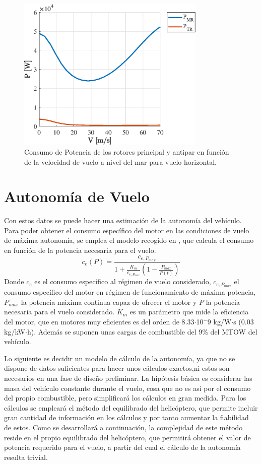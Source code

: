 \begin{figure}
	\centering
	\includegraphics[width=90mm]{graficos/PVH}
	\caption{Consumo de Potencia de los rotores principal y antipar en función de la velocidad de vuelo a nivel del mar para vuelo horizontal.}
	\label{PVH}
\end{figure}

\section{Autonomía de Vuelo}

Con estos datos se puede hacer una estimación de la autonomía del vehículo. 
Para poder obtener el consumo específico del motor en las condiciones de vuelo de máxima autonomía, se emplea el modelo recogido en \citet{Cuerva}, que calcula el consumo en función de la potencia necesaria para el vuelo.
\begin{equation}
	c_e(P)=\frac{c_{e,P_{max}}}{1+\frac{K_m}{c_{e,P_{max}}}(1-\frac{P_{max}}{P(t)})}
	\label{consumo}
\end{equation}
Donde $c_e$ es el consumo específico al régimen de vuelo considerado, $c_{e,P_{max}}$ el consumo específico del motor en régimen de funcionamiento de máxima potencia, $P_{max}$ la potencia máxima continua capaz de ofrecer el motor y $P$ la potencia necesaria para el vuelo considerado.
$K_m$ es un parámetro que mide la eficiencia del motor, que en motores muy eficientes es del orden de 8.33$\cdot$10$^-9$ kg/W$\cdot$s (0.03 kg/kW$\cdot$h).
Además se suponen unas cargas de combustible del 9\% del MTOW del vehículo. 

Lo siguiente es decidir un modelo de cálculo de la autonomía, ya que no se dispone de datos suficientes para hacer unos cálculos exactos,ni estos son necesarios en una fase de diseño preliminar. La hipótesis básica es considerar las masa del vehículo constante durante el vuelo, cosa que no es así por el consumo del propio combustible, pero simplificará los cálculos en gran medida.
Para los cálculos se empleará el método del equilibrado del helicóptero, que permite incluir gran cantidad de información en los cálculos y por tanto aumentar la fiabilidad de estos. Como se desarrollará a continuación, la complejidad de este método reside en el propio equilibrado del helicóptero, que permitirá obtener el valor de potencia requerido para el vuelo, a partir del cual el cálculo de la autonomía resulta trivial.

